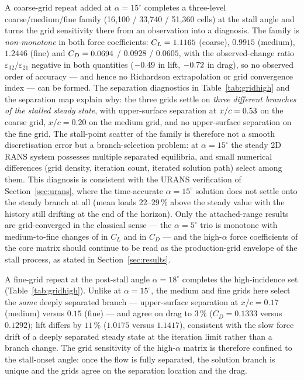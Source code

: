 \documentclass[11pt,a4paper]{article}
\begin{document}
A coarse-grid repeat added at $\alpha = 15^\circ$ completes a three-level coarse/medium/fine family (16{,}100 / 33{,}740 / 51{,}360 cells) at the stall angle and turns the grid sensitivity there from an observation into a diagnosis. The family is \emph{non-monotone} in both force coefficients: $C_L = 1.1165{}$ (coarse), $0.9915$ (medium), $1.2446$ (fine) and $C_D = 0.0694{}$ / $0.0928$ / $0.0605$, with the observed-change ratio $\varepsilon_{32}/\varepsilon_{21}$ negative in both quantities ($-0.49{}$ in lift, $-0.72{}$ in drag), so no observed order of accuracy --- and hence no Richardson extrapolation or grid convergence index --- can be formed. The separation diagnostics in Table~\ref{tab:gridhigh} and the separation map explain why: the three grids settle on \emph{three different branches of the stalled steady state}, with upper-surface separation at $x/c = 0.53{}$ on the coarse grid, $x/c = 0.20$ on the medium grid, and no upper-surface separation on the fine grid. The stall-point scatter of the family is therefore not a smooth discretisation error but a branch-selection problem: at $\alpha = 15^\circ$ the steady 2D RANS system possesses multiple separated equilibria, and small numerical differences (grid density, iteration count, iterated solution path) select among them. This diagnosis is consistent with the URANS verification of Section~\ref{sec:urans}, where the time-accurate $\alpha = 15^\circ$ solution does not settle onto the steady branch at all (mean loads 22--29\,\% above the steady value with the history still drifting at the end of the horizon). Only the attached-range results are grid-converged in the classical sense --- the $\alpha = 5^\circ$ trio is monotone with medium-to-fine changes of \ClGridDelta{} in $C_L$ and \CdGridDelta{} in $C_D$ --- and the high-$\alpha$ force coefficients of the core matrix should continue to be read as the production-grid envelope of the stall process, as stated in Section~\ref{sec:results}.

A fine-grid repeat at the post-stall angle $\alpha = 18^\circ$ completes the high-incidence set (Table~\ref{tab:gridhigh}). Unlike at $\alpha = 15^\circ$, the medium and fine grids here select the \emph{same} deeply separated branch --- upper-surface separation at $x/c = 0.17$ (medium) versus $0.15$ (fine) --- and agree on drag to $3\,\%$ ($C_D = 0.1333$ versus $0.1292$); lift differs by $11\,\%$ ($1.0175$ versus $1.1417$), consistent with the slow force drift of a deeply separated steady state at the iteration limit rather than a branch change. The grid sensitivity of the high-$\alpha$ matrix is therefore confined to the stall-onset angle: once the flow is fully separated, the solution branch is unique and the grids agree on the separation location and the drag.
\end{document}
